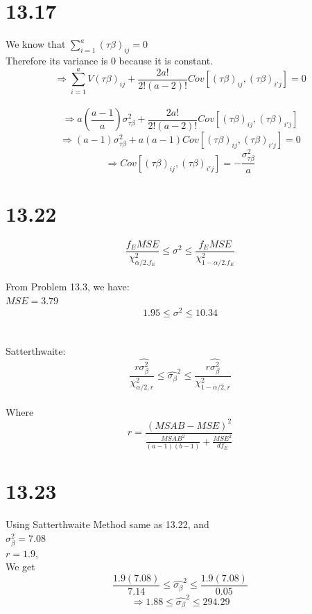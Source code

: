 \documentclass{article}
\begin{document}
\section*{13.17}
We know that $\sum_{i = 1}^a (\tau\beta)_{ij} = 0$
\\Therefore its variance is 0 because it is constant.
\\$$\Rightarrow \sum_{i = 1}^a V(\tau\beta)_{ij} + \frac{2a!}{2!(a-2)!}Cov[(\tau\beta)_{ij}, (\tau\beta)_{i'j}] = 0$$
\\$$\Rightarrow a(\frac{a - 1}{a}) \sigma_{\tau\beta}^2 + \frac{2a!}{2!(a-2)!} Cov[(\tau\beta)_{ij}, (\tau\beta)_{i'j}]$$
$$\Rightarrow (a-1)\sigma_{\tau\beta}^2 + a(a-1)Cov[(\tau\beta)_{ij}, (\tau\beta)_{i'j}] = 0$$
$$\Rightarrow Cov[(\tau\beta)_{ij}, (\tau\beta)_{i'j}] = -\frac{\sigma_{\tau\beta}^2}{a}$$

\section*{13.22}
$$\frac{f_EMSE}{\chi_{\alpha/2.f_E}^2} \leq \sigma^2 \leq \frac{f_EMSE}{\chi_{1-\alpha/2.f_E}^2}$$
\\From Problem 13.3, we have:
\\$MSE = 3.79$
$$1.95 \leq \sigma^2 \leq 10.34$$
\\
\\Satterthwaite: 
$$\frac{r\hat{\sigma_{\beta}^2}}{\chi_{\alpha/2, r}^2} \leq \hat{\sigma_{\beta}}^2 \leq \frac{r\hat{\sigma_{\beta}^2}}{\chi_{1-\alpha/2, r}^2}$$
\\Where $$r = \frac{(MSAB - MSE)^2}{\frac{MSAB^2}{(a - 1)(b - 1)} + \frac{MSE^2}{df_E}}$$

\section*{13.23}
Using Satterthwaite Method same as 13.22, and
\\$\sigma_{\beta}^2 = 7.08$
\\$r = 1.9$,
\\We get $$\frac{1.9(7.08)}{7.14} \leq \hat{\sigma_{\beta}}^2 \leq \frac{1.9(7.08)}{0.05}$$
$$\Rightarrow 1.88 \leq \hat{\sigma_{\beta}}^2 \leq 294.29$$
\end{document}
